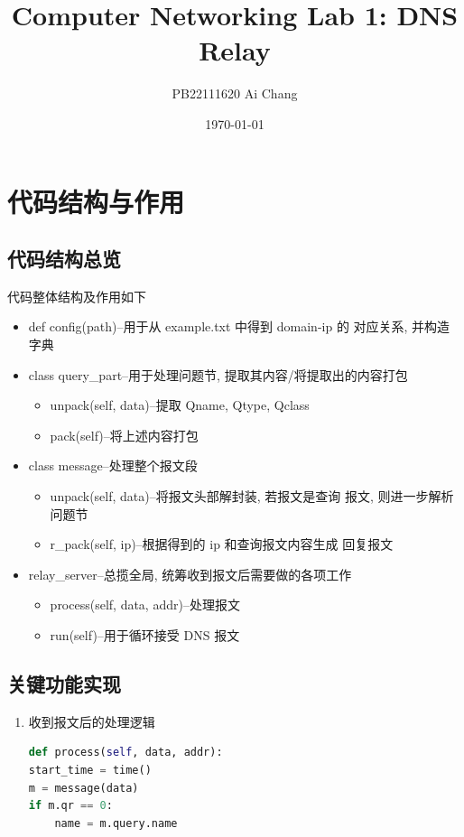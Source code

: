 \documentclass[UTF8]{ctexart}
\title{Computer Networking Lab 1: DNS Relay}
\author{PB22111620 Ai Chang}
\date{\today}
\begin{document}
\begin{sloppypar}
\maketitle

\section{代码结构与作用}
    \subsection{代码结构总览}
        代码整体结构及作用如下
            \begin{itemize}
                \item def config(path)--用于从 example.txt 中得到 domain-ip 的
                    对应关系, 并构造字典
                \item class query\_part--用于处理问题节, 提取其内容/将提取出的内容打包
                    \begin{itemize}
                        \item unpack(self, data)--提取 Qname, Qtype, Qclass
                        \item pack(self)--将上述内容打包
                    \end{itemize}
                \item class message--处理整个报文段
                    \begin{itemize}
                        \item unpack(self, data)--将报文头部解封装, 若报文是查询
                            报文, 则进一步解析问题节
                        \item r\_pack(self, ip)--根据得到的 ip 和查询报文内容生成
                            回复报文
                    \end{itemize}
                \item relay\_server--总揽全局, 统筹收到报文后需要做的各项工作
                    \begin{itemize}
                        \item process(self, data, addr)--处理报文
                        \item run(self)--用于循环接受 DNS 报文
                    \end{itemize}
            \end{itemize}
    \subsection{关键功能实现}
        \begin{enumerate}
            \item 收到报文后的处理逻辑
                \begin{lstlisting}[language=Python,
                    frame=single]
def process(self, data, addr):
start_time = time()
m = message(data)
if m.qr == 0:
    name = m.query.name


\end{lstlisting}
\end{enumerate}
\end{sloppypar}
\end{document}
